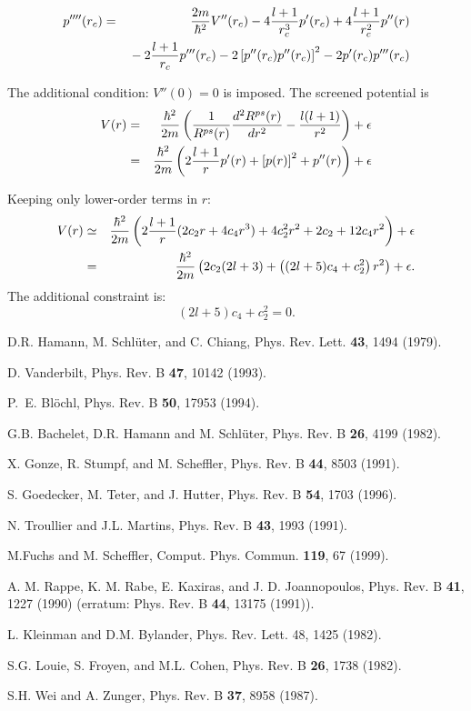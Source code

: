 \documentclass[12pt,a4paper]{article}
\begin{document}
\begin{eqnarray}
p''''(r_c) & = & {2m\over\hbar^2}V''(r_c) - 4 {l+1\over r^3_c}p'(r_c)
                 + 4{l+1\over r^2_c}p''(r) \nonumber \\ & & \mbox{} 
            - 2{l+1\over r_c}p'''(r_c)
           - 2 \left[p''(r_c)p''(r_c)\right]^2 -2 p'(r_c)p'''(r_c)
\end{eqnarray}

The additional condition: $V''(0)=0$ is imposed. 
The screened potential is
\begin{eqnarray}
V(r)&=&{\hbar^2\over2m}\left({1\over R^{ps}(r)}{d^2R^{ps}(r)\over dr^2} 
     - {l(l+1)\over r^2}\right)+\epsilon \\
    &=&{\hbar^2\over2m}\left( 2{l+1\over r} p'(r)+\left[p(r)\right]^2+p''(r)
       \right)+\epsilon
\end{eqnarray}

Keeping only lower-order terms in $r$:
\begin{eqnarray}
V(r) &\simeq&{\hbar^2\over2m}\left( 2{l+1\over r} (2c_2r + 4c_4r^3) 
               + 4c_2^2r^2 + 2c_2 + 12c_4r^2\right) + \epsilon \\
     &   =  & {\hbar^2\over2m}\left( 2c_2(2l+3) + 
              \left((2l+5)c_4+c_2^2\right) r^2\right)+ \epsilon .
\end{eqnarray}
The additional constraint is:
\begin{equation}
(2l+5)c_4+c_2^2=0.
\end{equation}



\begin{thebibliography}{10}

D.R. Hamann, M. Schl\"uter, and C. Chiang, 
Phys. Rev. Lett. {\bf 43}, 1494 (1979).

 D. Vanderbilt, Phys. Rev. B  {\bf 47}, 10142 (1993).

 P.~E. Bl\"ochl, Phys. Rev. B {\bf 50}, 17953 (1994).

G.B. Bachelet, D.R. Hamann and M. Schl\"uter, Phys. Rev. B {\bf 26},
4199 (1982). 

X. Gonze, R. Stumpf, and M. Scheffler, Phys. Rev. B {\bf 44}, 8503 (1991).

S. Goedecker, M. Teter, and J. Hutter, Phys. Rev. B {\bf 54}, 1703 (1996).

 N. Troullier and J.L. Martins, Phys. Rev. B {\bf 43},
1993 (1991).

M.Fuchs and M. Scheffler, Comput. Phys. Commun. {\bf 119}, 67 (1999).

 A. M. Rappe, K. M. Rabe, E. Kaxiras, and J. D. Joannopoulos, 
Phys. Rev. B {\bf 41}, 1227 (1990) 
(erratum: Phys. Rev. B {\bf 44}, 13175 (1991)).

 L. Kleinman and D.M. Bylander, Phys. Rev. Lett. 48, 1425 (1982).

S.G. Louie, S. Froyen, and M.L. Cohen, Phys. Rev. B {\bf 26}, 1738 (1982).

 S.H. Wei and A. Zunger, Phys. Rev. B {\bf 37}, 8958 (1987).

\end{thebibliography}
\end{document}
